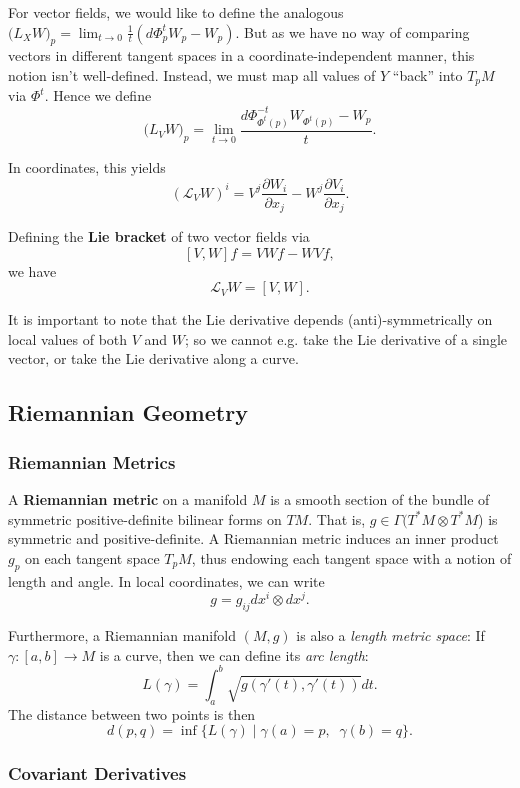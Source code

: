 \documentclass[reqno]{amsart}
\numberwithin{equation}{section}
\begin{document}
For vector fields, we would like to define the analogous
$\mathcal (L_X W)_p = \lim_{t \to 0} \frac{1}{t}(d\Phi^t_p W_p - W_p)$. But as we have no way of comparing vectors
in different tangent spaces in a coordinate-independent manner, this notion isn't well-defined. Instead, we must
map all values of $Y$ ``back'' into $T_pM$ via $\Phi^t$. Hence we define
$$
    \mathcal (L_V W)_p = \lim_{t \to 0} \frac{d\Phi^{-t}_{\Phi^t(p)}W_{\Phi^t(p)} - W_p}{t}.
$$

In coordinates, this yields
$$
    (\mathcal L_V W)^i = V^j \frac{\partial W_i}{\partial x_j} - W^j \frac{\partial V_i}{\partial x_j}.
$$

Defining the \textbf{Lie bracket} of two vector fields via
$$
    [V,W]f = VWf - WVf,
$$
we have
$$
    \mathcal L_V W = [V, W].
$$

It is important to note that the Lie derivative depends (anti)-symmetrically on local values of both $V$ and $W$;
so we cannot e.g. take the Lie derivative of a single vector, or take the Lie derivative along a curve.

\subsection{Riemannian Geometry}
\subsubsection{Riemannian Metrics}

A \textbf{Riemannian metric} on a manifold $M$ is a smooth section of the bundle of
symmetric positive-definite bilinear forms on $TM$. That is, $g \in \Gamma(T^*M \otimes T^*M$) is symmetric and 
positive-definite. A Riemannian metric induces an inner product $g_p$ on each tangent space $T_pM$, thus endowing
each tangent space with a notion of length and angle. In local coordinates, we can write
$$
    g = g_{ij} dx^i \otimes dx^j.
$$

Furthermore, a Riemannian manifold $(M, g)$ is also a \emph{length metric space}: If $\gamma : [a,b] \to M$ is
a curve, then we can define its \emph{arc length}:
$$
    L(\gamma) = \int_a^b \sqrt{g(\gamma'(t), \gamma'(t))} dt.
$$
The distance between two points is then
$$
    d(p,q) = \inf\{L(\gamma) \mid \gamma(a) = p, \; \; \gamma(b) = q\}.
$$

\subsubsection{Covariant Derivatives}
\end{document}
